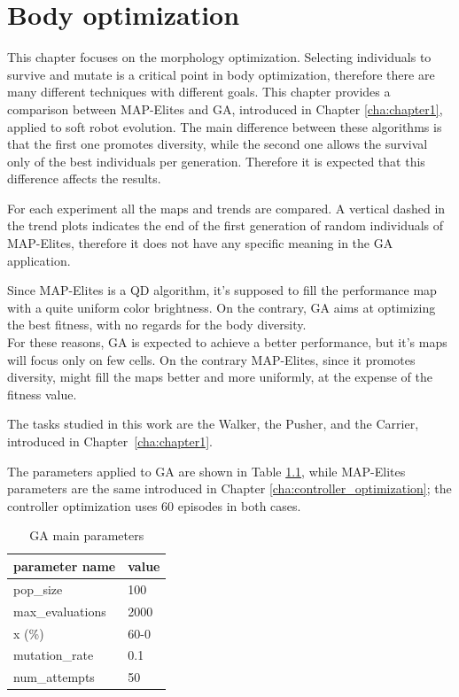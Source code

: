 \chapter{Body optimization}
\label{cha:body_optimization}

This chapter focuses on the morphology optimization.
Selecting individuals to survive and mutate is a critical point in body optimization, therefore there are many different techniques with different goals. This chapter provides a comparison between MAP-Elites and GA, introduced in Chapter \ref{cha:chapter1}, applied to soft robot evolution.
The main difference between these algorithms is that the first one promotes diversity, while the second one allows the survival only of the best individuals per generation. Therefore it is expected that this difference affects the results.

For each experiment all the maps and trends are compared. A vertical dashed in the trend plots indicates the end of the first generation of random individuals of MAP-Elites, therefore it does not have any specific meaning in the GA application.

Since MAP-Elites is a QD algorithm, it's supposed to fill the performance map with a quite uniform color brightness. On the contrary, GA aims at optimizing the best fitness, with no regards for the body diversity.\\
For these reasons, GA is expected to achieve a better performance, but it's maps will focus only on few cells.
On the contrary MAP-Elites, since it promotes diversity, might fill the maps better and more uniformly, at the expense of the fitness value.

The tasks studied in this work are the Walker, the Pusher, and the Carrier, introduced in Chapter~\ref{cha:chapter1}.

The parameters applied to GA are shown in Table \ref{tab:ga_parameters}, while MAP-Elites parameters are the same introduced in Chapter \ref{cha:controller_optimization}; the controller optimization uses 60 episodes in both cases.

\begin{table}[H]
    \centering
    \begin{tabular}{|ll|}
        \hline
        \textbf{parameter name} & \textbf{value}\\
        \hline
        pop\_size &  100\\
        max\_evaluations & 2000\\
        x (\%) & 60-0\\
        mutation\_rate & 0.1\\
        num\_attempts & 50\\
    \hline
    \end{tabular}
    \caption{GA main parameters}
    \label{tab:ga_parameters}
\end{table}


